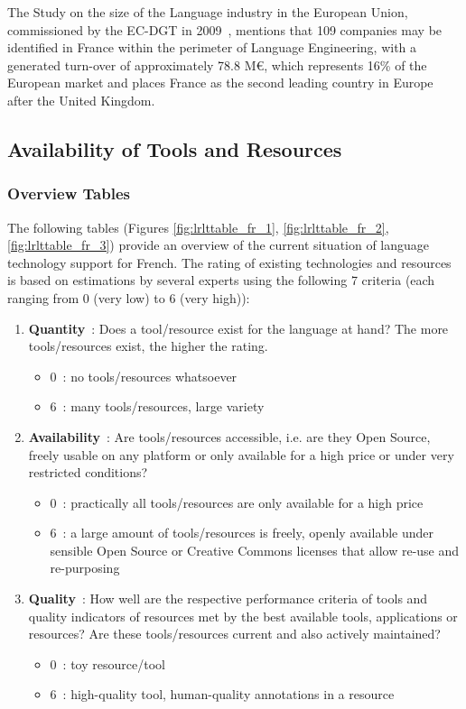 \documentclass[]{../metanetpaper}
\begin{document}
\begin{multicols}{2}
The Study on the size of the Language industry in the European Union,
commissioned by the EC-DGT in 2009~\cite{DGT09}, mentions that 109 companies may
be identified in France within the perimeter of Language Engineering,
with a generated turn-over of approximately 78.8 M€, which represents
16\% of the European market and places France as the second leading
country in Europe after the United Kingdom.

\subsection{Availability of Tools and Resources}

\subsubsection{Overview Tables}
The following tables (Figures \ref{fig:lrlttable_fr_1}, \ref{fig:lrlttable_fr_2}, \ref{fig:lrlttable_fr_3}) provide an overview of the current situation of
language technology support for French. The rating of existing
technologies and resources is based on estimations by several experts
using the following 7 criteria (each ranging from 0 (very low) to 6
(very high)):

\begin{enumerate}
\item {\bf Quantity}~: Does a tool/resource exist for the language at hand? The more tools/resources exist, the higher the rating.
      \begin{itemize}
      \item 0~: no tools/resources whatsoever
      \item 6~: many tools/resources, large variety
      \end{itemize}

\item {\bf Availability}~: Are tools/resources accessible, i.e. are they Open Source, freely usable on any platform or only available for a high price or under very restricted conditions?
      \begin{itemize}
      \item 0~: practically all tools/resources are only available for a high price
      \item 6~: a large amount of tools/resources is freely, openly available under sensible Open Source or Creative Commons licenses that allow re-use and re-purposing
      \end{itemize}

\item {\bf Quality}~: How well are the respective performance criteria of tools and quality indicators of resources met by the best available tools, applications or resources? Are these tools/resources current and also actively maintained?
      \begin{itemize}
      \item 0~: toy resource/tool
      \item 6~: high-quality tool, human-quality annotations in a resource
      \end{itemize}


\end{enumerate}
\end{multicols}
\end{document}
